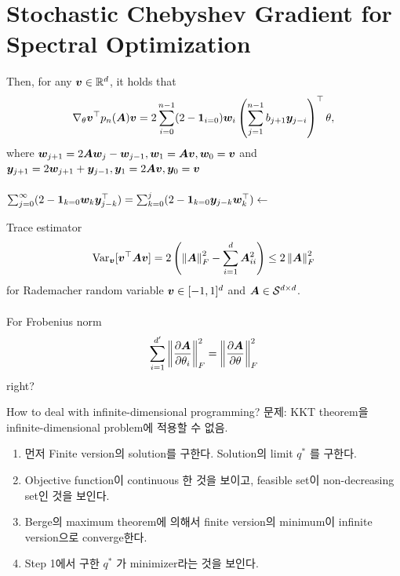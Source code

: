 \documentclass[9pt,t,aspectratio=169]{beamer}
\begin{document}
\section{Stochastic Chebyshev Gradient for Spectral Optimization}
\begin{frame}{}
 Then, for any ${\bm{v}} \in \mathbb{R}^d$, it holds that 
\begin{equation*}
    \nabla_{\theta} {\bm{v}}^{\top} p_n({\bm{A}}) {\bm{v}} = 2 \sum_{i=0}^{n-1} (2- \mathbf{1}_{i=0}) {\bm{w}}_i \left( \sum_{j=1}^{n-1} b_{j+1} {\bm{y}}_{j-i} \right)^{\top} \theta, 
\end{equation*}
where ${\bm{w}}_{j+1} = 2 {\bm{A}} {\bm{w}}_j - {\bm{w}}_{j-1}, {\bm{w}}_1 = {\bm{A}} {\bm{v}}, {\bm{w}}_0 = {\bm{v}}$ and ${\bm{y}}_{j+1} = 2{\bm{w}}_{j+1} + {\bm{y}}_{j-1}, {\bm{y}}_1 = 2 {\bm{A}} {\bm{v}}, {\bm{y}}_0 = {\bm{v}}$ \\~\\
$\sum_{j=0}^{\infty} (2- \mathbf{1}_{k=0} {\bm{w}}_k {\bm{y}}_{j-k}^{\top}) = \sum_{k=0}^j (2 - \mathbf{1}_{k=0} {\bm{y}}_{j-k} {\bm{w}}_k^{\top}) \gets$  
\end{frame}
\begin{frame}{Trace estimator}
\begin{equation*}
    \mathrm{Var}_{{\bm{v}}}[{\bm{v}}^{\top} {\bm{A}} {\bm{v}}] = 2 \left( \left\lVert{\bm{A}}\right\rVert_F^2 - \sum_{i=1}^d {\bm{A}}_{ii}^2 \right) \leq 2 \left\lVert{\bm{A}}\right\rVert_F^2 
\end{equation*}
for Rademacher random variable ${\bm{v}} \in [-1,1]^d$ and ${\bm{A}} \in \mathcal{S}^{d \times d}$. \\~\\
For Frobenius norm\\ 
\begin{equation*}
\sum_{i=1}^{d^{\prime}} \left\lVert\frac{\partial {\bm{A}}}{\partial  \theta_i}\right\rVert_F^2 = \left\lVert\frac{\partial {\bm{A}}}{\partial \theta}\right\rVert_F^2   
\end{equation*}
right? 
\end{frame}
\begin{frame}{How to deal with infinite-dimensional programming?}
문제: KKT theorem을 infinite-dimensional problem에 적용할 수 없음. 
\begin{enumerate}
    \item 먼저 Finite version의 solution를 구한다. Solution의 limit $q^*$ 를 구한다. 
    \item Objective function이 continuous 한 것을 보이고, feasible set이 non-decreasing set인 것을 보인다. 
    \item Berge의 maximum theorem에 의해서 finite version의 minimum이 infinite version으로 converge한다.  
    \item Step 1에서 구한 $q^*$ 가 minimizer라는 것을 보인다. 
\end{enumerate}
\end{frame}
\end{document}
